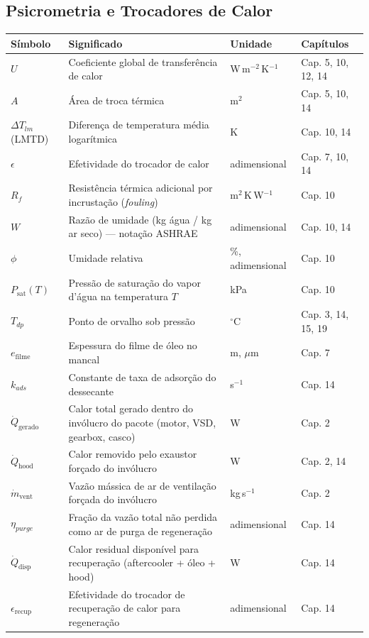\documentclass[12pt,a4paper]{article}
\numberwithin{equation}{section}
\numberwithin{table}{section}
\numberwithin{figure}{section}
\begin{document}
{\subsection*{Psicrometria e Trocadores de Calor}
\begin{longtable}{|p{2.0cm}|p{6.1cm}|p{2.1cm}|p{4.2cm}|}
	\hline
	\textbf{Símbolo} & \textbf{Significado} & \textbf{Unidade} & \textbf{Capítulos} \\ \hline
	\endhead
	$U$ & Coeficiente global de transferência de calor & W\,m$^{-2}$\,K$^{-1}$ & Cap. 5, 10, 12, 14 \\ \hline
	$A$ & Área de troca térmica & m$^2$ & Cap. 5, 10, 14 \\ \hline
	$\Delta T_{lm}$ (LMTD) & Diferença de temperatura média logarítmica & K & Cap. 10, 14 \\ \hline
	$\epsilon$ & Efetividade do trocador de calor & adimensional & Cap. 7, 10, 14 \\ \hline
	$R_f$ & Resistência térmica adicional por incrustação (\textit{fouling}) & m$^2$\,K\,W$^{-1}$ & Cap. 10 \\ \hline
	$W$\dag & Razão de umidade (kg água / kg ar seco) — notação ASHRAE & adimensional & Cap. 10, 14 \\ \hline
	$\phi$ & Umidade relativa & \%, adimensional & Cap. 10 \\ \hline
	$P_{\text{sat}}(T)$ & Pressão de saturação do vapor d'água na temperatura $T$ & kPa & Cap. 10 \\ \hline
	$T_{dp}$ & Ponto de orvalho sob pressão & $^{\circ}$C & Cap. 3, 14, 15, 19 \\ \hline
	$e_{\text{filme}}$\dag & Espessura do filme de óleo no mancal & m, $\mu$m & Cap. 7 \\ \hline
	$k_{ads}$\dag & Constante de taxa de adsorção do dessecante & s$^{-1}$ & Cap. 14 \\ \hline
	$\dot{Q}_{\text{gerado}}$ & Calor total gerado dentro do invólucro do pacote (motor, VSD, gearbox, casco) & W & Cap. 2 \\ \hline
	$\dot{Q}_{\text{hood}}$ & Calor removido pelo exaustor forçado do invólucro & W & Cap. 2, 14 \\ \hline
	$\dot{m}_{\text{vent}}$ & Vazão mássica de ar de ventilação forçada do invólucro & kg\,s$^{-1}$ & Cap. 2 \\ \hline
	$\eta_{purge}$ & Fração da vazão total não perdida como ar de purga de regeneração & adimensional & Cap. 14 \\ \hline
	$\dot{Q}_{\text{disp}}$ & Calor residual disponível para recuperação (aftercooler + óleo + hood) & W & Cap. 14 \\ \hline
	$\epsilon_{\text{recup}}$ & Efetividade do trocador de recuperação de calor para regeneração & adimensional & Cap. 14 \\ \hline
\end{longtable}

}
\end{document}
